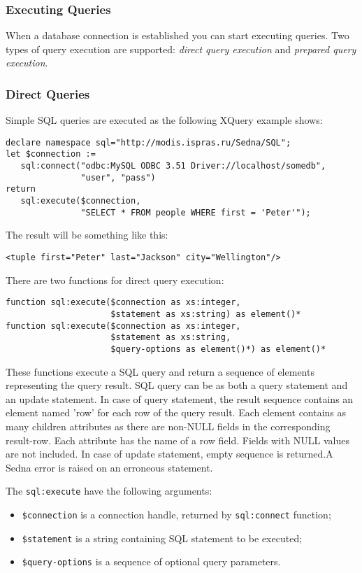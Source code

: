 \documentclass[a4paper,12pt]{article}
\newenvironment{citemize}
{\begin{itemize}
  \setlength{\itemsep}{0pt}
  \setlength{\parskip}{0pt}
  \setlength{\parsep}{0pt}}
{\end{itemize}}
\begin{document}
\subsubsection*{Executing Queries}
When a database connection is established you can start executing queries. Two
types of query execution are supported: \emph{direct query execution} and
\emph{prepared query execution}.


\subsubsection*{Direct Queries}
Simple SQL queries are executed as the following XQuery example shows:
\small{
\begin{verbatim}
declare namespace sql="http://modis.ispras.ru/Sedna/SQL";
let $connection :=
   sql:connect("odbc:MySQL ODBC 3.51 Driver://localhost/somedb",
               "user", "pass")
return
   sql:execute($connection, 
               "SELECT * FROM people WHERE first = 'Peter'");
\end{verbatim}}

The result will be something like this:
\small{
\begin{verbatim}
<tuple first="Peter" last="Jackson" city="Wellington"/>
\end{verbatim}}

There are two functions for direct query execution:
\begin{verbatim}
function sql:execute($connection as xs:integer,
                     $statement as xs:string) as element()*
function sql:execute($connection as xs:integer,
                     $statement as xs:string,
                     $query-options as element()*) as element()*
\end{verbatim}
These functions execute a SQL query and return a sequence of elements
representing the query result. SQL query can be as both a query statement and an
update statement. In case of query statement, the result sequence contains an
element named 'row' for each row of the query result. Each element contains as
many children attributes as there are non-NULL fields in the corresponding
result-row. Each attribute has the name of a row field. Fields with NULL values
are not included. In case of update statement, empty sequence is returned.A
Sedna error is raised on an erroneous statement.

The \verb!sql:execute! have the following arguments:
\begin{citemize}
\item\verb!$connection! is a connection handle, returned by \verb!sql:connect!
function;
\item\verb!$statement! is a string containing SQL statement to be executed;
\item\verb!$query-options! is a sequence of optional query parameters.
\end{citemize}
\end{document}
